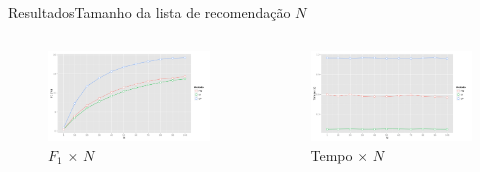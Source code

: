 \begin{frame}{Resultados}{Tamanho da lista de recomendação $N$}
\begin{columns}[b]
\begin{figure}[ht]
    \begin{center}
    \includegraphics[width=1\textwidth]{../img/F1_N}
    \end{center}
    \caption{$F_1$ $\times$ $N$}
    \label{fig:F1_N}
\end{figure}


\begin{figure}[ht]
    \begin{center}
    \includegraphics[width=1\textwidth]{../img/time_N}
    \end{center}
    \caption{Tempo $\times$ $N$}
    \label{fig:time_N}
\end{figure}
\end{columns}
\end{frame}

